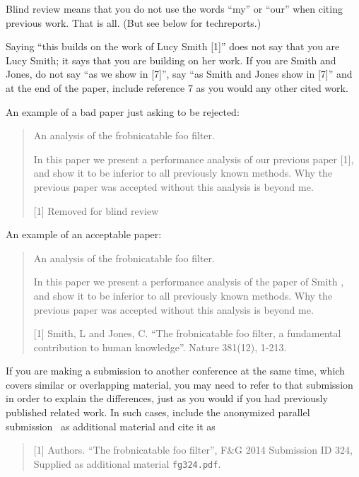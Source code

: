 Blind review means that you do not use the words ``my'' or ``our''
when citing previous work.  That is all.  (But see below for
techreports.)

Saying ``this builds on the work of Lucy Smith [1]'' does not say
that you are Lucy Smith; it says that you are building on her
work.  If you are Smith and Jones, do not say ``as we show in
[7]'', say ``as Smith and Jones show in [7]'' and at the end of the
paper, include reference 7 as you would any other cited work.

An example of a bad paper just asking to be rejected:
\begin{quote}
\begin{center}
    An analysis of the frobnicatable foo filter.
\end{center}

   In this paper we present a performance analysis of our
   previous paper [1], and show it to be inferior to all
   previously known methods.  Why the previous paper was
   accepted without this analysis is beyond me.

   [1] Removed for blind review
\end{quote}


An example of an acceptable paper:

\begin{quote}
\begin{center}
     An analysis of the frobnicatable foo filter.
\end{center}

   In this paper we present a performance analysis of the
   paper of Smith \etal [1], and show it to be inferior to
   all previously known methods.  Why the previous paper
   was accepted without this analysis is beyond me.

   [1] Smith, L and Jones, C. ``The frobnicatable foo
   filter, a fundamental contribution to human knowledge''.
   Nature 381(12), 1-213.
\end{quote}

If you are making a submission to another conference at the same time,
which covers similar or overlapping material, you may need to refer to that
submission in order to explain the differences, just as you would if you
had previously published related work.  In such cases, include the
anonymized parallel submission~\cite{Authors14} as additional material and
cite it as
\begin{quote}
[1] Authors. ``The frobnicatable foo filter'', F\&G 2014 Submission ID 324,
Supplied as additional material {\tt fg324.pdf}.
\end{quote}

